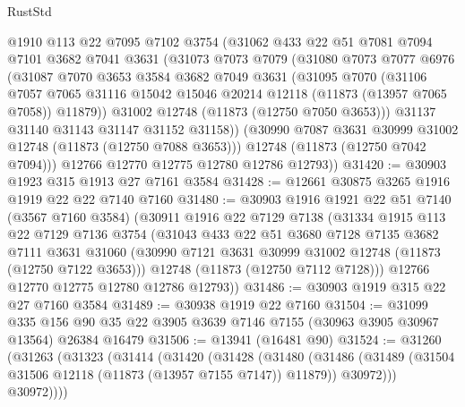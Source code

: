 \begin{lexlean}{RustStd}
\begin{coremodule}
        @1910
        @113
        @22
        @7095
        @7102
        @3754
        (@31062
          @433
          @22
          @51
          @7081
          @7094
          @7101
          @3682
          @7041
          @3631
          (@31073
            @7073
            @7079
            (@31080
              @7073
              @7077
              @6976
              (@31087
                @7070
                @3653
                @3584
                @3682
                @7049
                @3631
                (@31095
                  @7070
                  (@31106
                    @7057
                    @7065
                    @31116
                    @15042
                    @15046
                    @20214
                    @12118
                    (@11873 (@13957 @7065 @7058))
                    @11879))
                @31002
                @12748
                (@11873 (@12750 @7050 @3653)))
              @31137
              @31140
              @31143
              @31147
              @31152
              @31158))
          (@30990 @7087 @3631 @30999 @31002 @12748 (@11873 (@12750 @7088 @3653)))
          @12748
          (@11873 (@12750 @7042 @7094)))
        @12766
        @12770
        @12775
        @12780
        @12786
        @12793))
@31420 := @30903 @1923 @315 @1913 @27 @7161 @3584
@31428 := @12661 @30875 @3265 @1916 @1919 @22 @22 @7140 @7160
@31480 := @30903
    @1916
    @1921
    @22
    @51
    @7140
    (@3567 @7160 @3584)
    (@30911
      @1916
      @22
      @7129
      @7138
      (@31334
        @1915
        @113
        @22
        @7129
        @7136
        @3754
        (@31043
          @433
          @22
          @51
          @3680
          @7128
          @7135
          @3682
          @7111
          @3631
          @31060
          (@30990 @7121 @3631 @30999 @31002 @12748 (@11873 (@12750 @7122 @3653)))
          @12748
          (@11873 (@12750 @7112 @7128)))
        @12766
        @12770
        @12775
        @12780
        @12786
        @12793))
@31486 := @30903 @1919 @315 @22 @27 @7160 @3584
@31489 := @30938 @1919 @22 @7160
@31504 := @31099
    @335
    @156
    @90
    @35
    @22
    @3905
    @3639
    @7146
    @7155
    (@30963 @3905 @30967 @13564)
    @26384
    @16479
@31506 := @13941 (@16481 @90)
@31524 := @31260
    (@31263
      (@31323
        (@31414
          (@31420
            (@31428
              (@31480
                (@31486
                  (@31489 (@31504 @31506 @12118 (@11873 (@13957 @7155 @7147)) @11879))
                  @30972)))
            @30972))))

\end{coremodule}
\end{lexlean}
